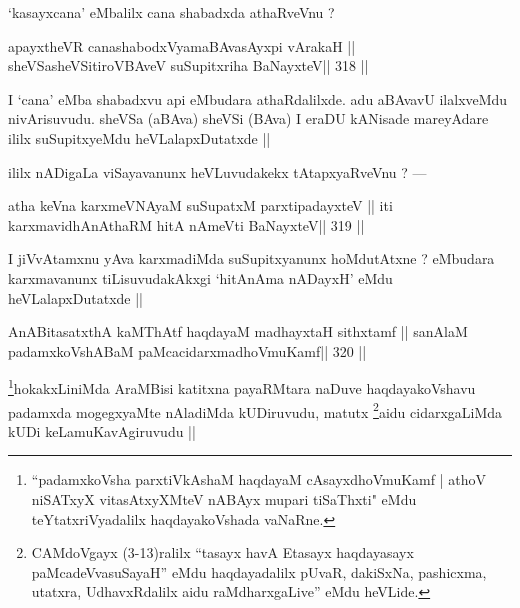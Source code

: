 \begin{artha}
`kasayxcana' eMbalilx cana shabadxda athaRveVnu ?
\end{artha}

\begin{shl}
apayxtheVR canashabodxV\s yamaBAvasAyxpi vArakaH ||
sheVSasheVSitiroVBAveV suSupitxriha BaNayxteV\hfill || 318 ||
\end{shl}

\begin{artha}
I `cana' eMba shabadxvu api eMbudara athaRdalilxde. adu aBAvavU ilalxveMdu nivArisuvudu. sheVSa (aBAva) sheVSi (BAva) I eraDU kANisade mareyAdare ililx suSupitxyeMdu heVLalapxDutatxde ||
\end{artha}

\begin{artha}
ililx nADigaLa viSayavanunx heVLuvudakekx tAtapxyaRveVnu ? ---
\end{artha}

\begin{shl}
atha keVna karxmeVNAyaM suSupatxM parxtipadayxteV ||
iti karxmavidhAnAthaRM hitA nAmeVti BaNayxteV\hfill || 319 ||
\end{shl}

\begin{artha}
I jiVvAtamxnu yAva karxmadiMda suSupitxyanunx hoMdutAtxne ? eMbudara 
karxmavanunx tiLisuvudakAkxgi `hitAnAma nADayxH' eMdu heVLalapxDutatxde ||
\end{artha}

\begin{shl}
AnABitasatxthA kaMThAtf haqdayaM madhayxtaH sithxtamf ||
sanAlaM padamxkoVshABaM paMcacidarxmadhoVmuKamf\hfill || 320 ||
\end{shl}

\begin{artha}
\footnote[1]{``padamxkoVsha parxtiVkAshaM haqdayaM cAsayxdhoVmuKamf | 
athoV niSATxyX vitasAtxyXMteV nABAyx mupari tiSaThxti" eMdu 
teYtatxriVyadalilx haqdayakoVshada vaNaRne.}hokakxLiniMda 
AraMBisi katitxna payaRMtara naDuve haqdayakoVshavu padamxda 
mogegxyaMte nAladiMda kUDiruvudu, matutx \footnote[2]{CAMdoVgayx 
(3-13)ralilx ``tasayx havA Etasayx haqdayasayx paMcadeVvasuSayaH'' eMdu 
haqdayadalilx pUvaR, dakiSxNa, pashicxma, utatxra, UdhavxRdalilx aidu 
raMdharxgaLive'' eMdu heVLide.}aidu cidarxgaLiMda kUDi keLamuKavAgiruvudu ||
\end{artha}

